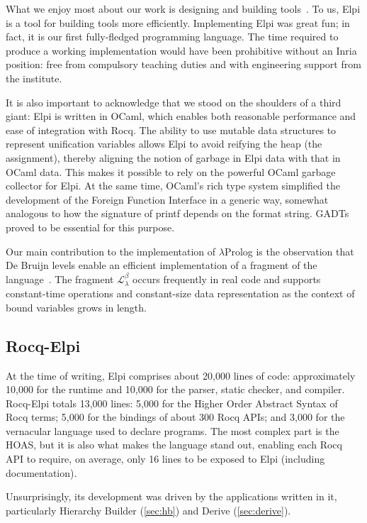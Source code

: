 \documentclass[a4paper, 11pt]{book}
\begin{document}
What we enjoy most about our work is designing and building
tools~\cite{DBLP:journals/jar/AspertiCTZ07,gonthier:inria-00258384,Coq-refman}.
To us, Elpi is a tool for building tools more efficiently. Implementing Elpi
was great fun; in fact, it is our first fully-fledged programming language. The
time required to produce a working implementation would have been prohibitive
without an Inria position: free from compulsory teaching duties and with
engineering support from the institute. %

It is also important to acknowledge that we stood on the shoulders of a third
giant: Elpi is written in OCaml, which enables both reasonable performance and
ease of integration with Rocq. The ability to use mutable data structures to
represent unification variables allows Elpi to avoid reifying the heap (the
assignment), thereby aligning the notion of garbage in Elpi data with that in
OCaml data. This makes it possible to rely on the powerful OCaml garbage
collector for Elpi. At the same time, OCaml's rich type system simplified the
development of the Foreign Function Interface in a generic way, somewhat
analogous to how the signature of printf depends on the format string.
GADTs proved to be essential for this purpose.

Our main contribution to the implementation of $\lambda$Prolog is the
observation that De Bruijn levels enable an efficient implementation of a
fragment of the language~\cite{dunchev15lpar}. The fragment
$\mathcal{L}_\lambda^{\beta}$ occurs frequently in real code and supports
constant-time operations and constant-size data representation as the context
of bound variables grows in length.

\subsection{Rocq-Elpi}


At the time of writing, Elpi comprises about 20,000 lines of code:
approximately 10,000 for the runtime and 10,000 for the parser, static checker,
and compiler. Rocq-Elpi totals 13,000 lines: 5,000 for the Higher Order
Abstract Syntax of Rocq terms; 5,000 for the bindings of
about 300 Rocq APIs; and 3,000 for the vernacular language used to declare
programs. The most complex part is the HOAS, but it is also what makes the
language stand out, enabling each Rocq API to require, on average, only 16
lines to be exposed to Elpi (including documentation).

Unsurprisingly, its development was driven by the applications written in it,
particularly Hierarchy Builder (\cref{sec:hb}) and Derive (\cref{sec:derive}).
\end{document}
